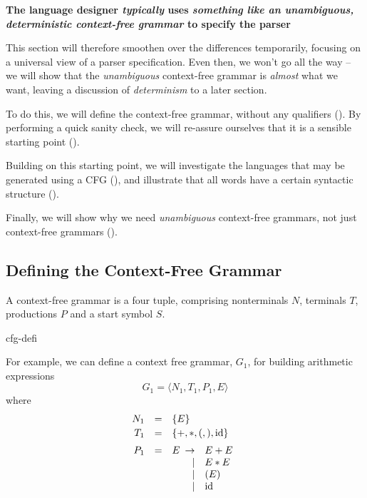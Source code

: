 \begin{center}
    \textbf{The language designer \textit{typically} uses \textit{something like an unambiguous, deterministic context-free grammar} to specify the parser}
\end{center}

This section will therefore smoothen over the differences temporarily, focusing on a universal view of a parser specification. Even then, we won't go all the way -- we will show that the \textit{unambiguous} context-free grammar is \textit{almost} what we want, leaving a discussion of \textit{determinism} to a later section.

To do this, we will define the context-free grammar, without any qualifiers (). By performing a quick sanity check, we will re-assure ourselves that it is a sensible starting point (). 

Building on this starting point, we will investigate the languages that may be generated using a CFG (), and illustrate that all words have a certain syntactic structure ().

Finally, we will show why we need \textit{unambiguous} context-free grammars, not just context-free grammars ().

\subsection{Defining the Context-Free Grammar}\label{section:cfg-defn}
A context-free grammar is a four tuple, comprising nonterminals $N$, terminals $T$, productions $P$ and a start symbol $S$. 

\begin{center}
    {cfg-defi}
\end{center}

For example, we can define a context free grammar, $G_1$, for building arithmetic expressions
\[G_1 = \langle N_1,T_1,P_1,E \rangle\]
where
\[
\begin{array}[t]{rcl}
N_1 &=& \{E\}  \\[0.5ex]
T_1 &=& \{+,*,(,),\text{id}\} \\[1.25ex]
P_1 &=& 
  E  \begin{array}[t]{rl}\to & E + E\\
  \mid & E * E\\
  \mid & (E) \\
  \mid & \text{id}
\end{array}
\end{array}
\]
\label{cfg-g1}

